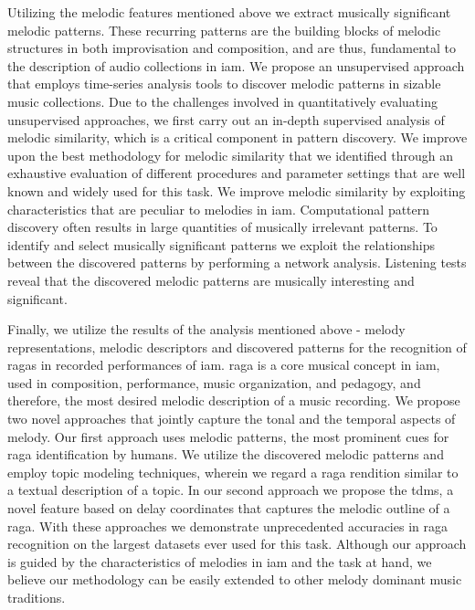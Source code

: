 Utilizing the melodic features mentioned above we extract musically significant melodic patterns. These recurring patterns are the building blocks of melodic structures in both improvisation and composition, and are thus, fundamental to the description of audio collections in \gls{iam}. We propose an unsupervised approach that employs time-series analysis tools to discover melodic patterns in sizable music collections. Due to the challenges involved in quantitatively evaluating unsupervised approaches, we first carry out an in-depth supervised analysis of  melodic similarity, which is a critical component in pattern discovery. We improve upon the best methodology for melodic similarity that we identified through an exhaustive evaluation of different procedures and parameter settings that are well known and widely used for this task. We improve melodic similarity by exploiting characteristics that are peculiar to melodies in \gls{iam}. Computational pattern discovery often results in large quantities of musically irrelevant patterns. To identify and select musically significant patterns we exploit the relationships between the discovered patterns by performing a network analysis. Listening tests reveal that the discovered melodic patterns are musically interesting and significant.

Finally, we utilize the results of the analysis  mentioned above - melody representations, melodic descriptors and discovered patterns for the recognition of \glspl{raga} in recorded performances of \gls{iam}. \Gls{raga} is a core musical concept in \gls{iam}, used in composition, performance, music organization, and pedagogy, and therefore, the most desired melodic description of a music recording. We propose two novel approaches that jointly capture the tonal and the temporal aspects of melody. Our first approach uses melodic patterns, the most prominent cues for raga identification by humans. We utilize the discovered melodic patterns and employ topic modeling techniques, wherein we regard a \gls{raga} rendition similar to a textual description of a topic. In our second approach we propose the \gls{tdms}, a novel feature based on delay coordinates that captures the melodic outline of a \gls{raga}. With these approaches we demonstrate unprecedented accuracies in \gls{raga} recognition on the largest datasets ever used for this task.  Although our approach is guided by the characteristics of melodies in \gls{iam} and the task at hand, we believe our methodology can be easily extended to other melody dominant music traditions.

